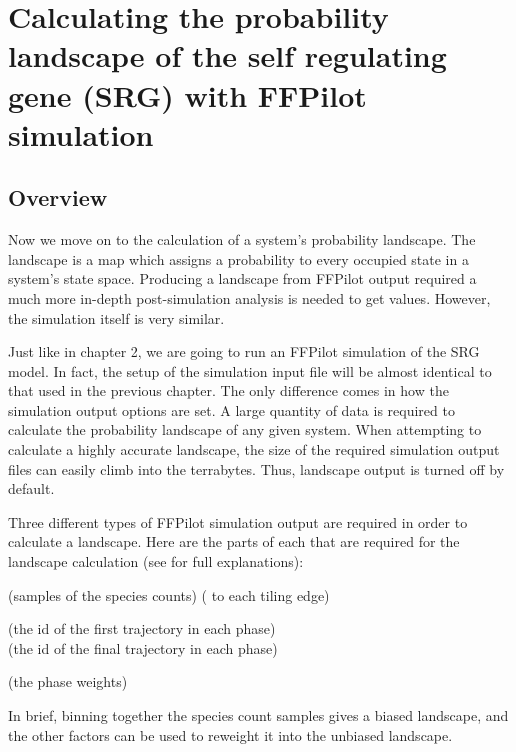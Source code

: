 \chapter{Calculating the probability landscape of the self regulating gene (SRG) with FFPilot simulation}

\section{Overview}\label{sec:overview_landscape_srg}

Now we move on to the calculation of a system's probability landscape. The landscape is a map which assigns a probability to every occupied state in a system's state space. Producing a landscape from FFPilot output required a much more in-depth post-simulation analysis is needed to get  values. However, the simulation itself is very similar.

Just like in chapter 2, we are going to run an FFPilot simulation of the SRG model. In fact, the setup of the simulation input file will be almost identical to that used in the previous chapter. The only difference comes in how the simulation output options are set. A large quantity of data is required to calculate the probability landscape of any given system. When attempting to calculate a highly accurate landscape, the size of the required simulation output files can easily climb into the terrabytes. Thus, landscape output is turned off by default.

Three different types of FFPilot simulation output are required in order to calculate a landscape. Here are the parts of each that are required for the landscape calculation (see  for full explanations):
\begin{description}[style=nextline]
    \item[SpeciesTimeSeries (turn on with \code{WriteInterval} option)]
         (samples of the species counts)
         ( to each tiling edge)
    \item[FFluxStageOutputRaw (turn on with \code{FFluxStageOutputRaw} option)]
         (the id of the first trajectory in each phase)\\
         (the id of the final trajectory in each phase)
    \item[FFluxStageOutputSummary (on by default)]
         (the phase weights)
\end{description}
In brief, binning together the species count samples gives a biased landscape, and the other factors can be used to reweight it into the unbiased landscape.

